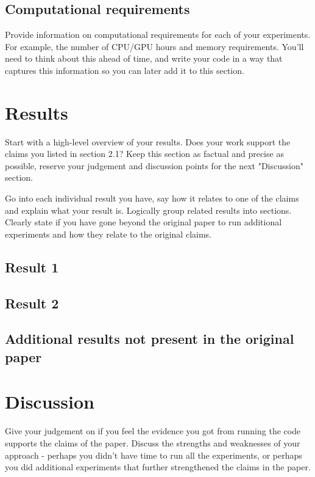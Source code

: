 \documentclass{article}
\begin{document}
\subsection{Computational requirements}
Provide information on computational requirements for each of your experiments. For example, the number of CPU/GPU hours and memory requirements. You'll need to think about this ahead of time, and write your code in a way that captures this information so you can later add it to this section. 

\section{Results}
Start with a high-level overview of your results. Does your work support the claims you listed in section 2.1? Keep this section as factual and precise as possible, reserve your judgement and discussion points for the next "Discussion" section. 

Go into each individual result you have, say how it relates to one of the claims and explain what your result is. Logically group related results into sections. Clearly state if you have gone beyond the original paper to run additional experiments and how they relate to the original claims. 

\subsection{Result 1}

\subsection{Result 2}

\subsection{Additional results not present in the original paper}

\section{Discussion}

Give your judgement on if you feel the evidence you got from running the code supports the claims of the paper. Discuss the strengths and weaknesses of your approach - perhaps you didn't have time to run all the experiments, or perhaps you did additional experiments that further strengthened the claims in the paper.
\end{document}
